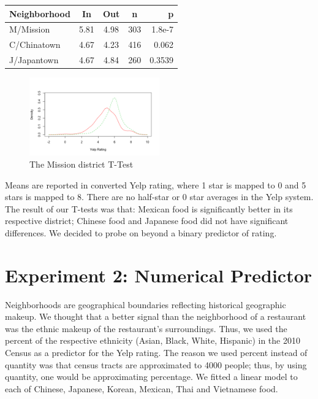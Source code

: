 \documentclass[11pt,twocolumn]{article}
\begin{document}
\begin{center}
  \begin{tabular}{| l | c | c | c | r | }
    \hline
    Neighborhood & In & Out & n & p \\ \hline
    M/Mission & 5.81 & 4.98 & 303 & 1.8e-7 \\ \hline \hline
    C/Chinatown & 4.67 & 4.23 & 416 & 0.062 \\ \hline
    J/Japantown & 4.67 & 4.84 & 260 & 0.3539 \\
    \hline
  \end{tabular}
\end{center}

\begin{figure}[h!]
  \caption{The Mission district T-Test}
  \centering
  \includegraphics[width=0.5\textwidth]{Mission_ttest}
\end{figure}

Means are reported in converted Yelp rating, where 1 star is mapped to 0 and 5 stars is mapped to 8. There are no half-star or 0 star averages in the Yelp system. The result of our T-tests was that: Mexican food is significantly better in its respective district; Chinese food and Japanese food did not have significant differences. We decided to probe on beyond a binary predictor of rating.

\section{Experiment 2: Numerical Predictor}

Neighborhoods are geographical boundaries reflecting historical geographic makeup. We thought that a better signal than the neighborhood of a restaurant was the ethnic makeup of the restaurant's surroundings. Thus, we used the percent of the respective ethnicity (Asian, Black, White, Hispanic) in the 2010 Census as a predictor for the Yelp rating. The reason we used percent instead of quantity was that census tracts are approximated to 4000 people; thus, by using quantity, one would be approximating percentage. We fitted a linear model to each of Chinese, Japanese, Korean, Mexican, Thai and Vietnamese food.
\end{document}
